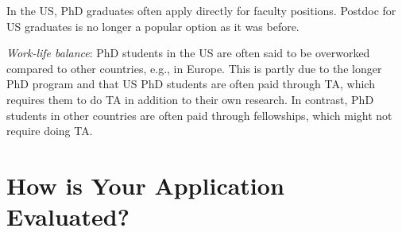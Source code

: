 \documentclass[oneside,11pt,dvipsnames]{book}
\begin{document}
In the US, PhD graduates often apply directly for faculty positions. Postdoc for US graduates is no longer a popular option as it was before.

\emph{Work-life balance}: PhD students in the US are often said to be overworked compared to other countries, e.g., in Europe.  This is partly due to the longer PhD program and that US PhD students are often paid through TA, which requires them to do TA in addition to their own research. In contrast, PhD students in other countries are often paid through fellowships, which might not require doing TA.






\chapter{How is Your Application Evaluated?}\label{sec:evalapps}
\end{document}
